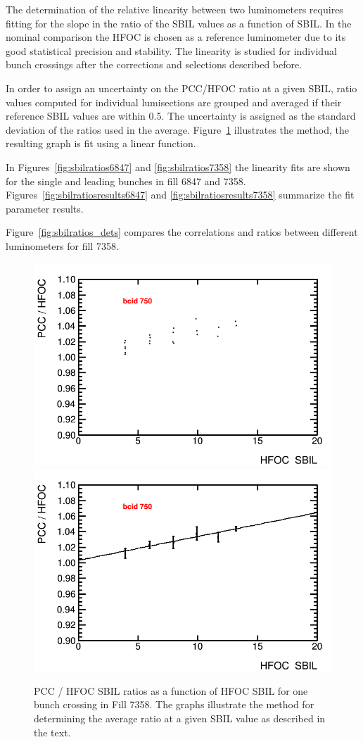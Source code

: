
The determination of the relative linearity between two luminometers requires fitting for the slope in the ratio of the SBIL values as a function of SBIL.
In the nominal comparison the HFOC is chosen as a reference luminometer due to its good statistical precision and stability.
The linearity is studied for individual bunch crossings after the corrections and selections described before.

In order to assign an uncertainty on the PCC/HFOC ratio at a given SBIL, ratio values computed for individual lumisections are grouped and averaged if their reference SBIL values are within 0.5.
The uncertainty is assigned as the standard deviation of the ratios used in the average.
Figure~\ref{fig:sbilratiomethod} illustrates the method, the resulting graph is fit using a linear function.


In Figures~\ref{fig:sbilratios6847} and \ref{fig:sbilratios7358} the linearity fits are shown for the single and leading bunches in fill 6847 and 7358.
Figures~\ref{fig:sbilratiosresults6847} and \ref{fig:sbilratiosresults7358} summarize  the fit parameter results.


Figure~\ref{fig:sbilratios_dets} compares the correlations and ratios between different luminometers for fill 7358.

\begin{figure}[t]
  \begin{center}
    \includegraphics[width=0.47\linewidth]{plots/plot_det_linearity_perbx_pcc_7358_750_scatter.png}
    \includegraphics[width=0.47\linewidth]{plots/plot_det_linearity_perbx_pcc_7358_750_avg.png}
    \caption{
      PCC / HFOC  SBIL ratios as a function of HFOC SBIL for one bunch crossing in Fill 7358.
      The graphs illustrate the method for determining the average ratio at a given SBIL value as described in the text.
    \label{fig:sbilratiomethod}
    }
  \end{center}
\end{figure}

